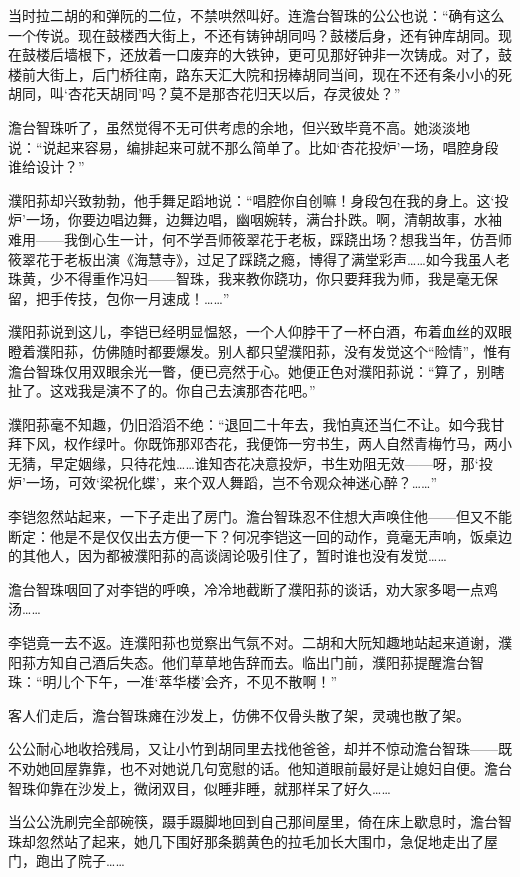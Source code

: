\par 当时拉二胡的和弹阮的二位，不禁哄然叫好。连澹台智珠的公公也说：“确有这么一个传说。现在鼓楼西大街上，不还有铸钟胡同吗？鼓楼后身，还有钟库胡同。现在鼓楼后墙根下，还放着一口废弃的大铁钟，更可见那好钟非一次铸成。对了，鼓楼前大街上，后门桥往南，路东天汇大院和拐棒胡同当间，现在不还有条小小的死胡同，叫‘杏花天胡同’吗？莫不是那杏花归天以后，存灵彼处？”
\par 澹台智珠听了，虽然觉得不无可供考虑的余地，但兴致毕竟不高。她淡淡地说：“说起来容易，编排起来可就不那么简单了。比如‘杏花投炉’一场，唱腔身段谁给设计？”
\par 濮阳荪却兴致勃勃，他手舞足蹈地说：“唱腔你自创嘛！身段包在我的身上。这‘投炉’一场，你要边唱边舞，边舞边唱，幽咽婉转，满台扑跌。啊，清朝故事，水袖难用——我倒心生一计，何不学吾师筱翠花于老板，踩跷出场？想我当年，仿吾师筱翠花于老板出演《海慧寺》，过足了踩跷之瘾，博得了满堂彩声……如今我虽人老珠黄，少不得重作冯妇——智珠，我来教你跷功，你只要拜我为师，我是毫无保留，把手传技，包你一月速成！……”
\par 濮阳荪说到这儿，李铠已经明显愠怒，一个人仰脖干了一杯白酒，布着血丝的双眼瞪着濮阳荪，仿佛随时都要爆发。别人都只望濮阳荪，没有发觉这个“险情”，惟有澹台智珠仅用双眼余光一瞥，便已亮然于心。她便正色对濮阳荪说：“算了，别瞎扯了。这戏我是演不了的。你自己去演那杏花吧。”
\par 濮阳荪毫不知趣，仍旧滔滔不绝：“退回二十年去，我怕真还当仁不让。如今我甘拜下风，权作绿叶。你既饰那邓杏花，我便饰一穷书生，两人自然青梅竹马，两小无猜，早定姻缘，只待花烛……谁知杏花决意投炉，书生劝阻无效——呀，那‘投炉’一场，可效‘梁祝化蝶’，来个双人舞蹈，岂不令观众神迷心醉？……”
\par 李铠忽然站起来，一下子走出了房门。澹台智珠忍不住想大声唤住他——但又不能断定：他是不是仅仅出去方便一下？何况李铠这一回的动作，竟毫无声响，饭桌边的其他人，因为都被濮阳荪的高谈阔论吸引住了，暂时谁也没有发觉……
\par 澹台智珠咽回了对李铠的呼唤，冷冷地截断了濮阳荪的谈话，劝大家多喝一点鸡汤……
\par 李铠竟一去不返。连濮阳荪也觉察出气氛不对。二胡和大阮知趣地站起来道谢，濮阳荪方知自己酒后失态。他们草草地告辞而去。临出门前，濮阳荪提醒澹台智珠：“明儿个下午，一准‘萃华楼’会齐，不见不散啊！”
\par 客人们走后，澹台智珠瘫在沙发上，仿佛不仅骨头散了架，灵魂也散了架。
\par 公公耐心地收拾残局，又让小竹到胡同里去找他爸爸，却并不惊动澹台智珠——既不劝她回屋靠靠，也不对她说几句宽慰的话。他知道眼前最好是让媳妇自便。澹台智珠仰靠在沙发上，微闭双目，似睡非睡，就那样呆了好久……
\par 当公公洗刷完全部碗筷，蹑手蹑脚地回到自己那间屋里，倚在床上歇息时，澹台智珠却忽然站了起来，她几下围好那条鹅黄色的拉毛加长大围巾，急促地走出了屋门，跑出了院子……
